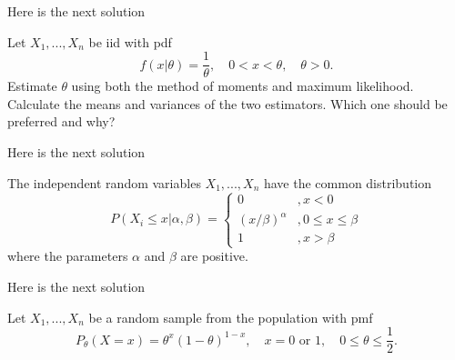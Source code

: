 \documentclass[12pt,letterpaper]{exam}
\begin{document}
\begin{questions}
	\begin{solution}
		Here is the next solution
	\end{solution}

\renewcommand{\thequestion}{9}
\question Let $X_1,...,X_n$ be iid with pdf $$f(x|\theta) = \frac{1}{\theta}, \quad 0 < x < \theta, \quad \theta > 0.$$
Estimate $\theta$ using both the method of moments and maximum likelihood. Calculate the means and variances of the two estimators. Which one should be preferred and why?
	\begin{solution}
		Here is the next solution
	\end{solution}

\renewcommand{\thequestion}{10}
\question The independent random variables $X_1,...,X_n$ have the common distribution
$$P(X_i \le x | \alpha, \beta) =
\begin{cases}
0 & , x< 0\\
(x/\beta)^\alpha & , 0 \le x \le \beta \\
1 & ,x > \beta
\end{cases}$$
where the parameters $\alpha$ and $\beta$ are positive.


	\begin{solution}
		Here is the next solution
	\end{solution}

\renewcommand{\thequestion}{12}
\question  Let $X_1,...,X_n$ be a random sample from the population with pmf
$$P_\theta (X = x) = \theta^x (1-\theta)^{1-x}, \quad x = 0 \text{ or } 1, \quad 0 \le \theta \le \frac{1}{2}.$$
	\begin{parts}

\end{parts}
\end{questions}
\end{document}
